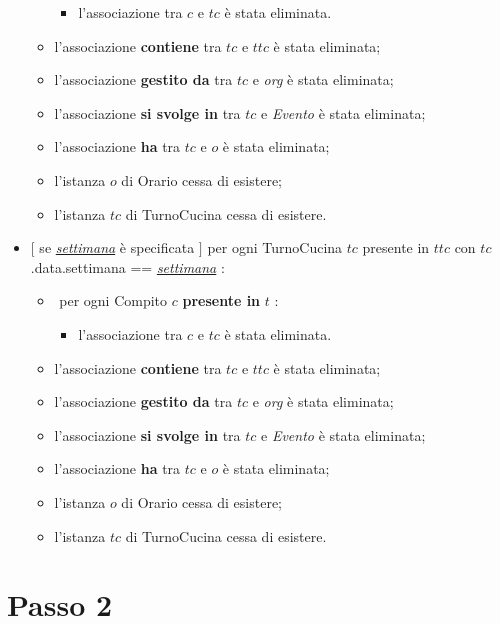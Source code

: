 \begin{itemize}
\begin{itemize}
    \begin{itemize}
        \item l'associazione tra $c$ e $tc$ è stata eliminata.
    \end{itemize}
    \item l'associazione \textbf{contiene} tra $tc$ e $ttc$ è stata eliminata;
    \item l'associazione \textbf{gestito da} tra $tc$ e \textit{org} è stata eliminata;
\item l'associazione \textbf{si svolge in} tra $tc$ e \textit{Evento} è stata eliminata;
    \item l'associazione \textbf{ha} tra $tc$ e $o$ è stata eliminata;
    \item l'istanza $o$ di Orario cessa di esistere;
    \item l'istanza $tc$ di TurnoCucina cessa di esistere.
\end{itemize}

   \item $[$ se \underline{\textit{settimana}} è specificata $]$ \textlangle per ogni TurnoCucina $tc$ presente in $ttc$ con $tc$.data.settimana == \underline{\textit{settimana}} \textrangle:
\begin{itemize}
   \item \textlangle $ $ per ogni Compito $c$ \textbf{presente in} $t$ \textrangle:
    \begin{itemize}
        \item l'associazione tra $c$ e $tc$ è stata eliminata.
        \end{itemize}
    \item l'associazione \textbf{contiene} tra $tc$ e $ttc$ è stata eliminata;
    \item l'associazione \textbf{gestito da} tra $tc$ e \textit{org} è stata eliminata;
\item l'associazione \textbf{si svolge in} tra $tc$ e \textit{Evento} è stata eliminata;
    \item l'associazione \textbf{ha} tra $tc$ e $o$ è stata eliminata;
    \item l'istanza $o$ di Orario cessa di esistere;
    \item l'istanza $tc$ di TurnoCucina cessa di esistere.
\end{itemize}

\end{itemize}

\section{Passo 2}
